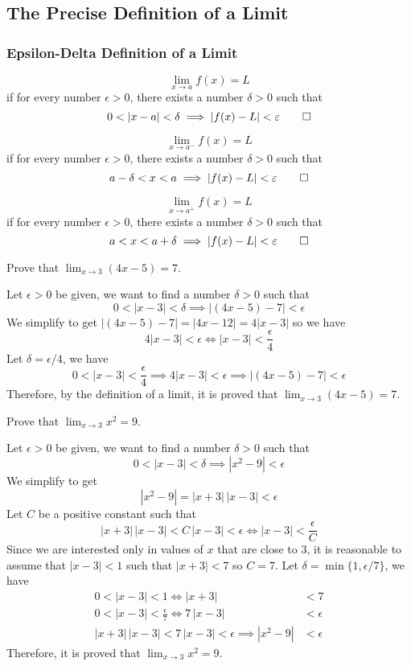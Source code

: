 \subsection{The Precise Definition of a Limit}

\subsubsection{Epsilon-Delta Definition of a Limit}
\begin{definition}
    \[\lim_{x\to a}f(x)=L\] if for every number \(\epsilon>0\), there exists a
    number \(\delta>0\) such that
    \[0<|x-a|<\delta\implies|f(x)-L|<\epsilon\qedhere\]
\end{definition}
\begin{definition}
    \[\lim_{x\to a^-}f(x)=L\] if for every number \(\epsilon>0\), there exists
    a number \(\delta>0\) such that
    \[a-\delta<x<a\implies|f(x)-L|<\epsilon\qedhere\]
\end{definition}
\begin{definition}
    \[\lim_{x\to a^+}f(x)=L\] if for every number \(\epsilon>0\), there exists
    a number \(\delta>0\) such that
    \[a<x<a+\delta\implies|f(x)-L|<\epsilon\qedhere\]
\end{definition}
\begin{problem}
    Prove that \(\lim_{x\to 3}(4x-5)=7\).
\end{problem}
\begin{solution}
    Let \(\epsilon>0\) be given, we want to find a number \(\delta>0\) such
    that
    \[0<|x-3|<\delta \implies|(4x-5)-7|<\epsilon\]
    We simplify to get \(|(4x-5)-7|=|4x-12|=4|x-3|\) so we have
    \[4|x-3|<\epsilon\iff|x-3|<\frac{\epsilon}{4}\]
    Let \(\delta=\epsilon/4\), we have
    \[0<|x-3|<\frac{\epsilon}{4}\implies4|x-3|<\epsilon\implies
    |(4x-5)-7|<\epsilon\]
    Therefore, by the definition of a limit, it is proved that
    \(\lim_{x\to 3}(4x-5)=7\).
\end{solution}
\begin{problem}
    Prove that \(\lim_{x\to 3}x^2=9\).
\end{problem}
\begin{solution}
    Let \(\epsilon>0\) be given, we want to find a number \(\delta>0\) such
    that
    \[0<|x-3|<\delta\implies|x^2-9|<\epsilon\]
    We simplify to get \[|x^2-9|=|x+3|\,|x-3|<\epsilon\]
    Let \(C\) be a positive constant such that
    \[|x+3|\,|x-3|<C\,|x-3|<\epsilon \iff |x-3|<\frac{\epsilon}{C}\]
    Since we are interested only in values of \(x\) that are close to 3, it is
    reasonable to assume that \(|x-3|<1\) such that \(|x+3|<7\) so \(C=7\).
    Let \(\delta=\min\{1,\epsilon/7\}\), we have
    \begin{align*}
        0<|x-3|<1 \iff |x+3| &< 7 \\
        0<|x-3|<\frac{\epsilon}{7} \iff 7\,|x-3| &< \epsilon \\
        |x+3|\,|x-3|<7\,|x-3|<\epsilon\implies|x^2-9| &< \epsilon
    \end{align*}
    Therefore, it is proved that \(\lim_{x\to 3}x^2=9\).
\end{solution}
